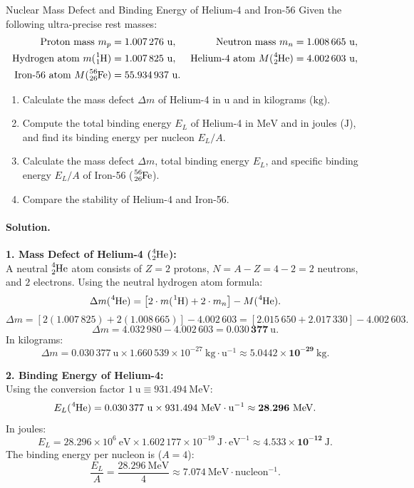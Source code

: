 \begin{workedexample}{Nuclear Mass Defect and Binding Energy of Helium-4 and Iron-56}
Given the following ultra-precise rest masses:
\begin{align*}
\text{Proton mass } m_p &= 1.007\,276\ \mathrm{u}, & \text{Neutron mass } m_n &= 1.008\,665\ \mathrm{u}, \\
\text{Hydrogen atom } m(\ce{^1_1H}) &= 1.007\,825\ \mathrm{u}, & \text{Helium-4 atom } M(\ce{^4_2He}) &= 4.002\,603\ \mathrm{u}, \\
\text{Iron-56 atom } M(\ce{^{56}_{26}Fe}) &= 55.934\,937\ \mathrm{u}.
\end{align*}
\begin{enumerate}[leftmargin=1.4em,itemsep=3pt]
  \item Calculate the mass defect $\Delta m$ of Helium-4 in $\mathrm{u}$ and in kilograms ($\mathrm{kg}$).
  \item Compute the total binding energy $E_L$ of Helium-4 in $\mathrm{MeV}$ and in joules ($\mathrm{J}$), and find its binding energy per nucleon $E_L / A$.
  \item Calculate the mass defect $\Delta m$, total binding energy $E_L$, and specific binding energy $E_L / A$ of Iron-56 ($\ce{^{56}_{26}Fe}$).
  \item Compare the stability of Helium-4 and Iron-56.
\end{enumerate}

\paragraph{Solution.}
\textbf{1. Mass Defect of Helium-4 ($\ce{^4_2He}$):}\\
A neutral $\ce{^4_2He}$ atom consists of $Z = 2$ protons, $N = A - Z = 4 - 2 = 2$ neutrons, and $2$ electrons.
Using the neutral hydrogen atom formula:
\[
\Delta m(\ce{^4He}) = \left[ 2 \cdot m(\ce{^1H}) + 2 \cdot m_n \right] - M(\ce{^4He}).
\]
\[
\Delta m = \left[ 2(1.007\,825) + 2(1.008\,665) \right] - 4.002\,603 = [2.015\,650 + 2.017\,330] - 4.002\,603.
\]
\[
\Delta m = 4.032\,980 - 4.002\,603 = \mathbf{0.030\,377\ \mathrm{u}}.
\]
In kilograms:
\[
\Delta m = 0.030\,377\ \mathrm{u} \times 1.660\,539 \times 10^{-27}\ \mathrm{kg\cdot u^{-1}} \approx \mathbf{5.0442 \times 10^{-29}\ \mathrm{kg}}.
\]

\textbf{2. Binding Energy of Helium-4:}\\
Using the conversion factor $1\ \mathrm{u} \equiv 931.494\ \mathrm{MeV}$:
\[
E_L(\ce{^4He}) = 0.030\,377\ \mathrm{u} \times 931.494\ \mathrm{MeV\cdot u^{-1}} \approx \mathbf{28.296\ \mathrm{MeV}}.
\]
In joules:
\[
E_L = 28.296 \times 10^6\ \mathrm{eV} \times 1.602\,177 \times 10^{-19}\ \mathrm{J\cdot eV^{-1}} \approx \mathbf{4.533 \times 10^{-12}\ \mathrm{J}}.
\]
The binding energy per nucleon is ($A = 4$):
\[
\frac{E_L}{A} = \frac{28.296\ \mathrm{MeV}}{4} \approx \mathbf{7.074\ \mathrm{MeV\cdot nucleon^{-1}}}.
\]


\end{workedexample}
